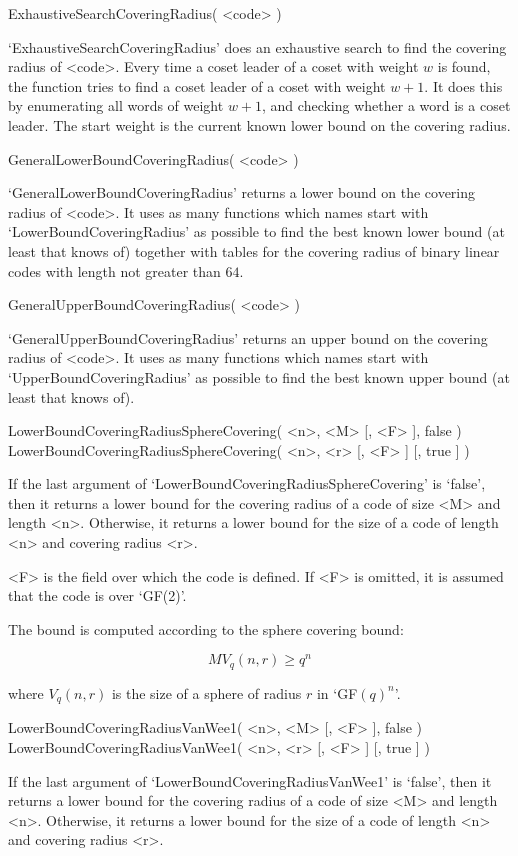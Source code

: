 \>ExhaustiveSearchCoveringRadius( <code> )

`ExhaustiveSearchCoveringRadius' does an exhaustive search  to  find  the
covering radius of <code>. Every time a coset  leader  of  a  coset  with
weight $w$ is found, the function tries to find a coset leader of a coset
with weight $w+1$. It does this by enumerating all words of weight $w+1$,
and checking whether a word is a coset leader. The start  weight  is  the
current known lower bound on the covering radius.

\>GeneralLowerBoundCoveringRadius( <code> )

`GeneralLowerBoundCoveringRadius' returns a lower bound on  the  covering
radius of <code>. It uses  as  many  functions  which  names  start  with
`LowerBoundCoveringRadius' as possible to find the best known lower bound
(at least that {{\GUAVA}} knows of) together with tables for the covering
radius of binary linear codes with length not greater than $64$.

\>GeneralUpperBoundCoveringRadius( <code> )

`GeneralUpperBoundCoveringRadius' returns an upper bound on the  covering
radius of <code>. It uses  as  many  functions  which  names  start  with
`UpperBoundCoveringRadius' as possible to find the best known upper bound
(at least that {\GUAVA} knows of).

\>LowerBoundCoveringRadiusSphereCovering( <n>, <M> [, <F> ], false )
\>LowerBoundCoveringRadiusSphereCovering( <n>, <r> [, <F> ] [, true ] )

If the last argument of `LowerBoundCoveringRadiusSphereCovering' is
`false', then it returns a lower bound for the covering radius of a
code of size <M> and length <n>.
Otherwise, it returns a lower bound for the size of a code of length
<n> and covering radius <r>.

<F> is the field over which the code is defined. If <F> is omitted, it is
assumed that the code is over `GF(2)'.

The bound is computed according to the sphere covering bound:

$$
M V_q(n,r) \geq q^n
$$

where $V_q(n,r)$ is the size of a sphere of radius $r$ in `GF$(q)^n$'.

\>LowerBoundCoveringRadiusVanWee1( <n>, <M> [, <F> ], false )
\>LowerBoundCoveringRadiusVanWee1( <n>, <r> [, <F> ] [, true ] )

If the last argument of `LowerBoundCoveringRadiusVanWee1' is
`false', then it returns a lower bound for the covering radius of a
code of size <M> and length <n>.
Otherwise, it returns a lower bound for the size of a code of length
<n> and covering radius <r>.

